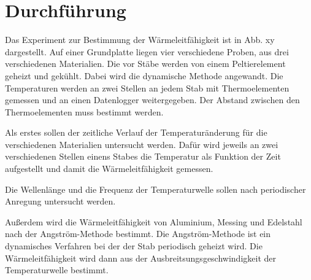 \section{Durchführung}
\label{sec:Durchführung}

Das Experiment zur Bestimmung der Wärmeleitfähigkeit ist in Abb. xy dargestellt. 
Auf einer Grundplatte liegen vier verschiedene Proben, aus drei verschiedenen Materialien. Die vor Stäbe werden von einem Peltierelement geheizt und gekühlt. 
Dabei wird die dynamische Methode angewandt. Die Temperaturen werden an zwei Stellen an jedem Stab mit Thermoelementen gemessen und an einen Datenlogger weitergegeben. Der Abstand zwischen den Thermoelementen muss bestimmt werden. 

Als erstes sollen der zeitliche Verlauf der Temperaturänderung für die verschiedenen Materialien untersucht werden. 
Dafür wird jeweils an zwei verschiedenen Stellen einens Stabes die Temperatur als Funktion der Zeit aufgestellt und damit die Wärmeleitfähigkeit gemessen. 

Die Wellenlänge und die Frequenz der Temperaturwelle sollen nach periodischer Anregung untersucht werden. 

Außerdem wird die Wärmeleitfähigkeit von Aluminium, Messing und Edelstahl nach der Angström-Methode bestimmt. 
Die Angström-Methode ist ein dynamisches Verfahren bei der der Stab periodisch geheizt wird. Die Wärmeleitfähigkeit wird dann aus der Ausbreitsungsgeschwindigkeit der Temperaturwelle bestimmt. 

